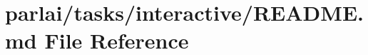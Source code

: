 \hypertarget{parlai_2tasks_2interactive_2README_8md}{}\section{parlai/tasks/interactive/\+R\+E\+A\+D\+ME.md File Reference}
\label{parlai_2tasks_2interactive_2README_8md}
